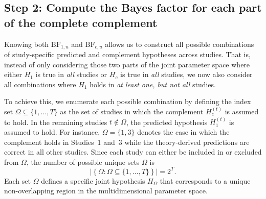 \documentclass[letterpaper,11pt,oneside]{article}
\begin{document}
\subsection{Step 2: Compute the Bayes factor for each part of the complete complement}

\label{sec:step-2-compute-bf-omega-u-t}

Knowing both $\mathrm{BF}_{1,u}$ and $\mathrm{BF}_{c,u}$ allows us to construct all possible combinations of study-specific predicted and complement hypotheses across studies. That is, instead of only considering those two parts of the joint parameter space where either $H_1$ is true in \textit{all} studies or $H_c$ is true in \textit{all} studies, we now also consider all combinations where $H_1$ holds in \textit{at least one, but not all} studies.

To achieve this, we enumerate each possible combination by defining the index set $\Omega \subseteq \{1,\dots, T\}$ as the set of studies in which the complement $H_c^{(t)}$ is assumed to hold. In the remaining studies $t \notin \Omega$, the predicted hypothesis $H_1^{(t)}$ is assumed to hold. For instance, $\Omega = \{1,3\}$ denotes the case in which the complement holds in Studies~1 and~3 while the theory-derived predictions are correct in all other studies. Since each study can either be included in or excluded from $\Omega$, the number of possible unique sets $\Omega$ is
$$
\left|\left\{\Omega : \Omega \subseteq \{1,\dots,T\}\right\}\right| = 2^T.
$$
Each set $\Omega$ defines a specific joint hypothesis $H_{\Omega}$ that corresponds to a unique non-overlapping region in the multidimensional parameter space. 
\end{document}

